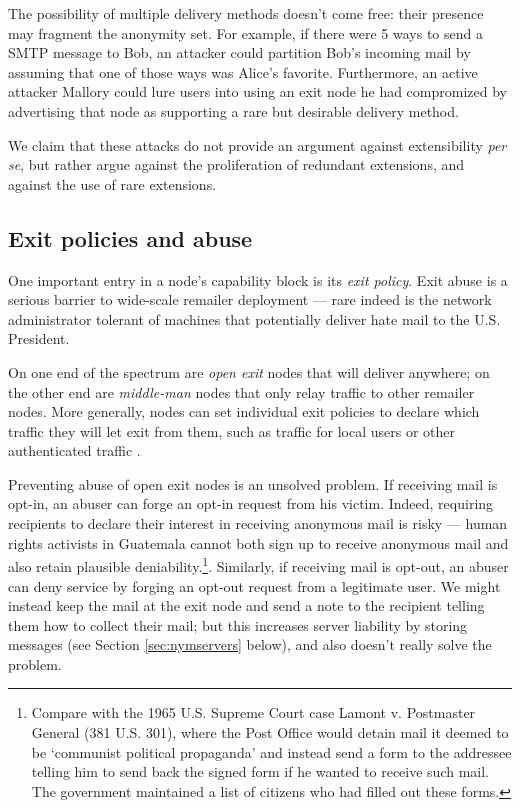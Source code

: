 \documentclass{llncs}
\begin{document}
The possibility of multiple delivery methods doesn't come free: their
presence may fragment the anonymity set.  For example, if there were 5
ways to send a SMTP message to Bob, an attacker could partition Bob's
incoming mail by assuming that one of those ways was Alice's favorite.
Furthermore, an active attacker Mallory could lure users into using an
exit node he had compromized by advertising that node as supporting a
rare but desirable delivery method.

We claim that these attacks do not provide an argument against
extensibility \emph{per se}, but rather argue against the proliferation
of redundant extensions, and against the use of rare extensions.  

\subsection{Exit policies and abuse}
\label{subsec:exitpolicies}

One important entry in a node's capability block is its \emph{exit
policy}. Exit abuse is a serious barrier to wide-scale remailer deployment
--- rare indeed is the network administrator tolerant of machines that
potentially deliver hate mail to the U.S. President.

On one end of the spectrum are \emph{open exit} nodes that will
deliver anywhere; on the other end are \emph{middle-man} nodes that
only relay traffic to other remailer nodes. More generally, nodes can
set individual exit policies to declare which traffic they will let
exit from them, such as traffic for local users or other authenticated
traffic \cite{onion-discex00}.

Preventing abuse of open exit nodes is an unsolved problem. If
receiving mail is opt-in, an abuser can forge an opt-in request from
his victim. Indeed, requiring recipients to declare their interest
in receiving anonymous mail is risky --- human rights activists in
Guatemala cannot both sign up to receive anonymous mail and also retain
plausible deniability.\footnote{
  Compare with the 1965 U.S. Supreme Court case Lamont v. Postmaster
  General (381 U.S. 301), where the Post Office would detain mail it
  deemed to be `communist political propaganda' and instead send a form
  to the addressee telling him to send back the signed form if he wanted
  to receive such mail. The government maintained a list of citizens
  who had filled out these forms.
}. Similarly, if receiving mail is opt-out, an abuser can deny service
by forging an opt-out request from a legitimate user. We might instead
keep the mail at the exit node and send a note to the recipient
telling them how to collect their mail; but this increases
server liability by storing messages (see Section \ref{sec:nymservers}
below), and also doesn't really solve the problem.
\end{document}
